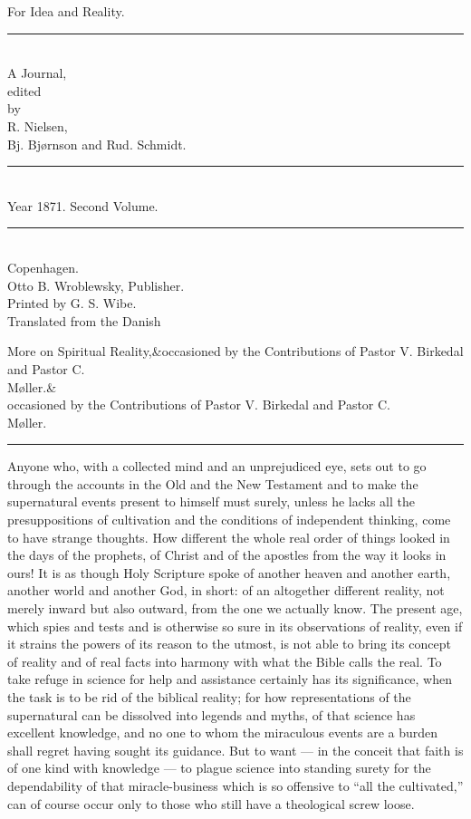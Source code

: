 \documentclass[12pt,a4paper,openany]{book}
\newcommand{\opage}[1]{\marginnote{\footnotesize\textit{[#1]}}}
\newcommand{\essayhead}[2]{\begin{center}{\large #1}\ifx&#2&\else\\[0.3em]{\normalsize #2}\fi\\[0.5em]\rule{3em}{0.4pt}\end{center}\medskip\noindent}
\begin{document}
\clearpage

\begin{titlepage}
\begin{center}
\vspace*{3em}
{\Huge For Idea and Reality.}\\[1em]
\rule{8em}{0.4pt}\\[1em]
{\large A Journal,}\\[0.8em]
{\small edited}\\[0.4em]
{\footnotesize by}\\[0.6em]
{\large R. Nielsen,}\\[0.4em]
{\large Bj. Bjørnson and Rud. Schmidt.}\\[1em]
\rule{8em}{0.4pt}\\[0.6em]
{\large Year 1871. Second Volume.}\\[0.6em]
\rule{8em}{0.4pt}\\[4em]
Copenhagen.\\[0.4em]
Otto B. Wroblewsky, Publisher.\\[1.5em]
{\small Printed by G. S. Wibe.}\\[3em]
{\small Translated from the Danish}
\end{center}
\end{titlepage}


\essayhead{More on Spiritual Reality,}{occasioned by the Contributions of Pastor V. Birkedal and Pastor C.\\ Møller.}
\setcounter{footnote}{0}%
\opage{1}Anyone who, with a collected mind and an unprejudiced eye, sets out to go through
the accounts in the Old and the New Testament
and to make the supernatural events
present to himself must surely, unless he lacks all
the presuppositions of cultivation and the conditions of independent thinking,
come to have strange thoughts. How different the whole
real order of things looked in the days of the prophets,
of Christ and of the apostles from the way it looks in ours!
It is as though Holy Scripture spoke of another
heaven and another earth, another world and another
God, in short: of an altogether different reality, not merely inward but
also outward, from the one we actually know.
The present age, which spies and tests and is otherwise so sure in its observations of reality,
even if it strains the powers of its reason
to the utmost, is not able to bring
its concept of reality and of real facts
into harmony with what the Bible calls the real. To
take refuge in science for help and assistance
certainly has its significance, when the task is to be rid of the
\setcounter{footnote}{0}%
\opage{2}biblical reality; for how representations of the
supernatural can be dissolved into legends and myths, of that
science has excellent knowledge, and no one to whom
the miraculous events are a burden shall regret
having sought its guidance. But to want --- in
the conceit that faith is of one kind with knowledge --- to plague
science into standing surety for the dependability
of that miracle-business which is so offensive to
``all the cultivated,'' can of course occur only to those who
still have a theological screw loose.
\end{document}
